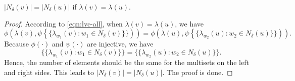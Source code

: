 \begin{lemma}
\label{lemma:equal_neighbour_size}
$|N_{\delta}(v)| = |N_{\delta}(u)|$ if $\lambda(v)=\lambda(u)$. 
\end{lemma}
\begin{proof}
 According to \cref{eqn:lvc-all}, when $\lambda(v)=\lambda(u)$, we have
\begin{equation*}
    \phi\left(\lambda(v), \psi\left\{\!\!\{\lambda_{w_1}(v): w_1\in N_{\delta}(v)\}\!\!\}\right)\right) =
    \phi\left(\lambda(u), \psi\left\{\!\!\{\lambda_{w_2}(u): w_2\in N_{\delta}(u)\}\!\!\}\right)\right).
\end{equation*}
Because $\phi(\cdot)$ and $\psi(\cdot)$ are injective, we have 
\begin{equation*}
    \{\!\!\{\lambda_{w_1}(v): w_1\in N_{\delta}(v)\}\!\!\} =
    \{\!\!\{\lambda_{w_2}(u): w_2\in N_{\delta}(u)\}\!\!\}.
\end{equation*}
Hence, the number of elements should be the same for the multisets on the left and right sides. This leads to $|N_{\delta}(v)| = |N_{\delta}(u)|$. The proof is done.
\end{proof}

\bfcspg*

